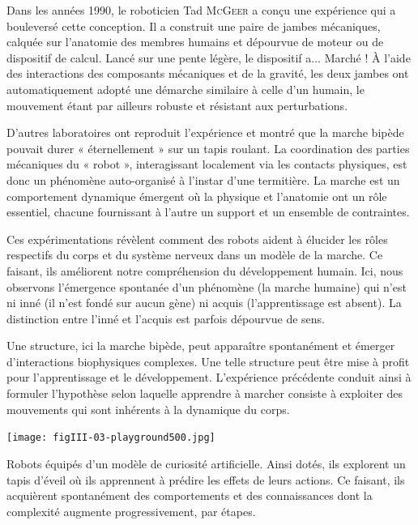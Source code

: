 Dans les années 1990, le roboticien Tad \textsc{McGeer} a conçu une expérience qui a bouleversé cette conception. Il a construit une paire de jambes mécaniques, calquée sur l’anatomie des membres humains et dépourvue de moteur ou de dispositif de calcul. Lancé sur une pente légère, le dispositif a... Marché ! À l’aide des interactions des composants mécaniques et de la gravité, les deux jambes ont automatiquement adopté une démarche similaire à celle d’un humain, le mouvement étant par ailleurs robuste et résistant aux perturbations.

D’autres laboratoires ont reproduit l’expérience et montré que la marche bipède pouvait durer « éternellement » sur un tapis roulant. La coordination des parties mécaniques du « robot », interagissant localement via les contacts physiques, est donc un phénomène auto-organisé à l’instar d’une termitière. La marche est un comportement dynamique émergent où la physique et l’anatomie ont un rôle essentiel, chacune fournissant à l’autre un support et un ensemble de contraintes.

Ces expérimentations révèlent comment des robots aident à élucider les rôles respectifs du corps et du système nerveux dans un modèle de la marche. Ce faisant, ils améliorent notre compréhension du développement humain. Ici, nous observons l’émergence spontanée d’un phénomène (la marche humaine) qui n’est ni inné (il n’est fondé sur aucun gène) ni acquis (l’apprentissage est absent). La distinction entre l’inné et l’acquis est parfois dépourvue de sens.

Une structure, ici la marche bipède, peut apparaître spontanément et émerger d’interactions biophysiques complexes. Une telle structure peut être mise à profit pour l’apprentissage et le développement. L’expérience précédente conduit ainsi à formuler l’hypothèse selon laquel\-le apprendre à marcher consiste à exploiter des mouvements qui sont inhérents à la dynamique du corps.

\vspace{0.75\baselineskip}
\begin{jazzfigure}
\texttt{[image: figIII-03-playground500.jpg]}
\vspace{-10pt}
\caption{\label{fig:III.3}Robots équipés d'un modèle de curiosité artificielle. Ainsi dotés, ils explorent un tapis d’éveil où ils apprennent à prédire les effets de leurs actions. Ce faisant, ils acquièrent spontanément des comportements et des connaissances dont la complexité augmente progressivement, par étapes.}
\end{jazzfigure}

